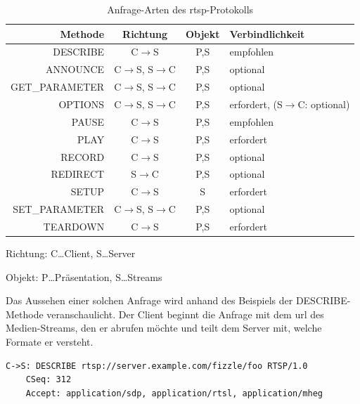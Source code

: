\begin{table}
    \centering\begin{tabular}{r|c|c|l}
        \toprule
        \textbf{Methode}&\textbf{Richtung}         &\textbf{Objekt} &\textbf{Verbindlichkeit}\\
        \midrule
        DESCRIBE        &C$\rightarrow$S                    &P,S    &empfohlen\\
        ANNOUNCE        &C$\rightarrow$S, S$\rightarrow$C   &P,S    &optional\\
        GET\_PARAMETER  &C$\rightarrow$S, S$\rightarrow$C   &P,S    &optional\\
        OPTIONS         &C$\rightarrow$S, S$\rightarrow$C   &P,S    &erfordert, (S$\rightarrow$C: optional)\\
        PAUSE           &C$\rightarrow$S                    &P,S    &empfohlen\\
        PLAY            &C$\rightarrow$S                    &P,S    &erfordert\\
        RECORD          &C$\rightarrow$S                    &P,S    &optional\\
        REDIRECT        &S$\rightarrow$C                    &P,S    &optional\\
        SETUP           &C$\rightarrow$S                    &S      &erfordert\\
        SET\_PARAMETER  &C$\rightarrow$S, S$\rightarrow$C   &P,S    &optional\\
        TEARDOWN        &C$\rightarrow$S                    &P,S    &erfordert\\
        \bottomrule
    \end{tabular}\bigskip\par
    Richtung: C\dots Client, S\dots Server\par
    Objekt: P\dots Präsentation, S\dots Streams
    \caption[Anfrage-Arten des \ac{rtsp}-Protokolls \cite{ietf-rtsp}]
            {Anfrage-Arten des \ac{rtsp}-Protokolls \cite[aus dem Englischen übersetzt]{ietf-rtsp}}
    \label{tab:rtsp-req}
\end{table}
Das Aussehen einer solchen Anfrage wird anhand des Beispiels der DESCRIBE-Methode veranschaulicht.
Der Client beginnt die Anfrage mit dem \ac{url} des Medien-Streams, den er abrufen möchte und teilt dem Server mit, welche Formate er versteht.
\begin{verbatim}
C->S: DESCRIBE rtsp://server.example.com/fizzle/foo RTSP/1.0
    CSeq: 312
    Accept: application/sdp, application/rtsl, application/mheg
\end{verbatim}
